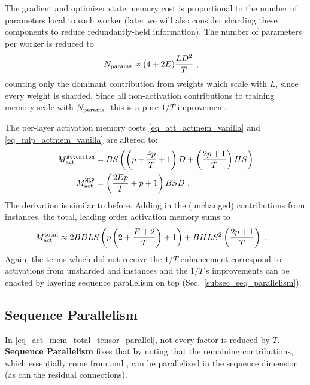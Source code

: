 \documentclass[11pt]{article}
\begin{document}
 The gradient and optimizer state memory cost is proportional to the number of parameters local to
 each worker (later we will also consider sharding these components to reduce redundantly-held
 information). The number of parameters per worker is reduced to
\begin{align}
    N _{ \rm params } &\approx  (4 + 2E) \frac{ L D ^{ 2 } }{ T }\ ,
    \label{eq_approx_params_tensor_parallel}
\end{align}
counting only the dominant contribution from weights which scale with $ L $, since every weight is
sharded. Since all non-activation contributions to training memory scale with $ N _{ {\rm params}  }
$, this is a pure $ 1/T $ improvement.

 The per-layer activation memory costs \eqref{eq_att_actmem_vanilla} and
 \eqref{eq_mlp_actmem_vanilla} are altered to:
\begin{align}
M _{ \rm act  } ^\texttt{Attention} &= BS \left ( \left (p + \frac{ 4p }{ T }+1 \right )D + \left
(\frac{ 2p+1 }{ T } \right )HS  \right ) \nonumber\\
M _{ \rm act  } ^\texttt{MLP} &= \left (\frac{ 2Ep }{ T }+p+1 \right )BSD\ .
\label{eq_act_mem_attn_mlp}
\end{align}
The derivation is similar to before. Adding in the (unchanged) contributions from
 instances, the total, leading order activation memory sums to
\begin{align}
    M _{ {\rm act}  } ^{ {\rm  total}  } & \approx  2BDLS   \left ( p \left (2+ \frac{ E+2 }{ T }\right ) + 1   \right )
    + BHLS ^{ 2 } \left ( \frac{ 2p+1 }{ T }\right ) \label{eq_act_mem_total_tensor_parallel}\ .
\end{align}
Again, the terms which did not receive the $ 1/T $ enhancement correspond to activations from
unsharded  and  instances and the $ 1/T $'s improvements can
be enacted by layering sequence parallelism on top (Sec.~\ref{subsec_seq_parallelism}).


\subsection{Sequence Parallelism \label{subsec_seq_parallelism}}

In \eqref{eq_act_mem_total_tensor_parallel}, not every factor is reduced by $ T $.
\textbf{Sequence Parallelism} fixes that by noting that the remaining contributions, which
essentially come from  and , can be parallelized in the sequence dimension (as can
the residual connections).
\end{document}
